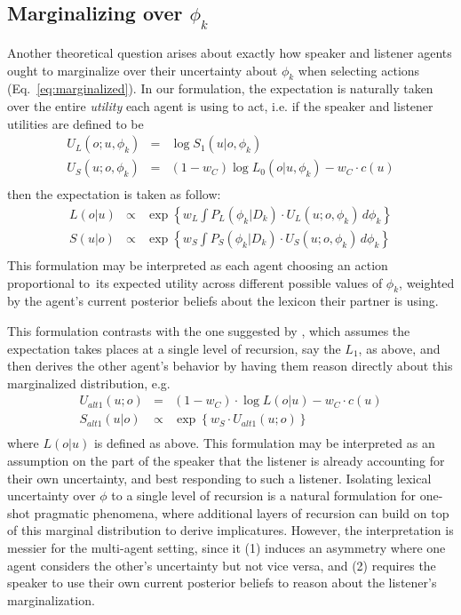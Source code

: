 \documentclass[10pt, man, floatsintext]{apa7}
\begin{document}
\subsection{Marginalizing over $\phi_k$}
Another theoretical question arises about exactly how speaker and listener agents ought to marginalize over their uncertainty about $\phi_k$ when selecting actions (Eq.~\ref{eq:marginalized}). 
In our formulation, the expectation is naturally taken over the entire \emph{utility} each agent is using to act, i.e. if the speaker and listener utilities are defined to be 
$$
\begin{array}{rcl}
U_L(o;u, \phi_k) & = &  \log S_1(u|o, \phi_k)\\
U_S(u;o, \phi_k) & = &  (1-w_C)\log L_0(o|u, \phi_k) - w_C \cdot c(u) \\
\end{array}
$$
then the expectation is taken as follow:
$$
\begin{array}{rcl}
L(o|u) & \propto & \exp\left\{w_L\int P_L(\phi_k |D_k)\cdot U_L(u; o, \phi_k) \, d \phi_k\right\}\\
S(u|o) & \propto & \exp\left\{w_S\int P_S(\phi_k | D_k) \cdot U_S(u; o, \phi_k) \, d \phi_k\right\} \\
\end{array}
$$
This formulation may be interpreted as each agent choosing an action proportional to its expected utility across different possible values of $\phi_k$, weighted by the agent's current posterior beliefs about the lexicon their partner is using.

This formulation contrasts with the one suggested by , which assumes the expectation takes places at a single level of recursion, say the $L_1$, as above, and then derives the other agent's behavior by having them reason directly about this marginalized distribution, e.g.
$$
\begin{array}{rcl}
U_{alt1}(u;o) & = & (1-w_C) \cdot \log L(o|u) - w_C \cdot c(u)\\
S_{alt1}(u|o) & \propto & \exp\left\{w_S \cdot U_{alt1}(u;o)\right\} \\
\end{array}
$$
where $L(o|u)$ is defined as above.
This formulation may be interpreted as an assumption on the part of the speaker that the listener is already accounting for their own uncertainty, and best responding to such a listener.
Isolating lexical uncertainty over $\phi$ to a single level of recursion is a natural formulation for one-shot pragmatic phenomena, where additional layers of recursion can build on top of this marginal distribution to derive implicatures.
However, the interpretation is messier for the multi-agent setting, since it (1) induces an asymmetry where one agent considers the other's uncertainty but not vice versa, and (2) requires the speaker to use their own current posterior beliefs to reason about the listener's marginalization.
\end{document}
